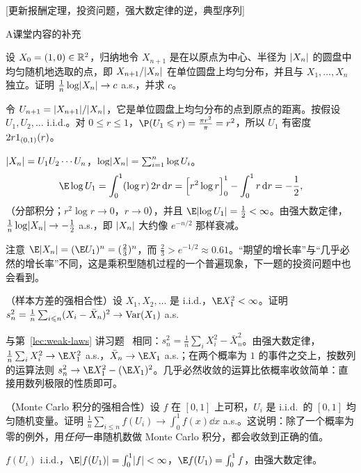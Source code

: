 [更新报酬定理，投资问题，强大数定律的逆，典型序列]
\label{hw:strong-laws}


\begin{exercises}{A}{课堂内容的补充}
\item\label{ex:strong-laws:A1} 设 $X_0=(1,0)\in\mathbb{R}^2$，归纳地令 $X_{n+1}$ 是在以原点为中心、半径为 $\lvert X_n\rvert$ 的圆盘中均匀随机地选取的点，即 $X_{n+1}/\lvert X_n\rvert$ 在单位圆盘上均匀分布，并且与 $X_1,\dots,X_n$ 独立。证明 $\frac1n\log\lvert X_n\rvert\to c$ a.s.，并求 $c$。
\begin{solution}
令 $U_{n+1}=\lvert X_{n+1}\rvert/\lvert X_n\rvert$，它是单位圆盘上均匀分布的点到原点的距离。按假设 $U_1,U_2,\dots$ i.i.d.。对 $0\leqslant r\leqslant1$，$\P(U_1\leqslant r)=\frac{\pi r^2}\pi=r^2$，所以 $U_1$ 有密度 $2r1_{(0,1)}(r)$。

$\lvert X_n\rvert=U_1U_2\cdots U_n$，$\log\lvert X_n\rvert=\sum_{i=1}^n\log U_i$。
\[
\E\log U_1=\int_0^1(\log r)\,2r\dd r=\Bigl[r^2\log r\Bigr]_0^1-\int_0^1r\dd r=-\frac12,
\]
（分部积分；$r^2\log r\to0$，$r\to0$），并且 $\E\abs{\log U_1}=\frac12<\infty$。由强大数定律，$\frac1n\log\lvert X_n\rvert\to-\frac12$ a.s.，即 $\lvert X_n\rvert$ 大约像 $e^{-n/2}$ 那样衰减。

注意 $\E\abs{X_n}=(\E U_1)^n=(\frac23)^n$，而 $\frac23>e^{-1/2}\approx0.61$。“期望的增长率”与“几乎必然的增长率”不同，这是乘积型随机过程的一个普遍现象，下一题的投资问题中也会看到。
\end{solution}

\item\label{ex:strong-laws:A2} （样本方差的强相合性）设 $X_1,X_2,\dots$ 是 i.i.d.，$\E X_1^2<\infty$。证明 $s_n^2=\frac1n\sum_{i\leqslant n}(X_i-\bar X_n)^2\to\operatorname{Var}(X_1)$ a.s.
\begin{solution}
与第~\ref{lec:weak-laws} 讲习题~ 相同：$s_n^2=\frac1n\sum_iX_i^2-\bar X_n^2$。由强大数定律，$\frac1n\sum_iX_i^2\to \E X_1^2$ a.s.，$\bar X_n\to \E X_1$ a.s.；在两个概率为 $1$ 的事件之交上，按数列的运算法则 $s_n^2\to \E X_1^2-(\E X_1)^2$。几乎必然收敛的运算比依概率收敛简单：直接用数列极限的性质即可。
\end{solution}

\item\label{ex:strong-laws:A3} （Monte Carlo 积分的强相合性）设 $f$ 在 $[0,1]$ 上可积，$U_i$ 是 i.i.d.\ 的 $[0,1]$ 均匀随机变量。证明 $\frac1n\sum_{i\leqslant n}f(U_i)\to\int_0^1f(x)\dd x$ a.s.。这说明：除了一个概率为零的例外，用\emph{任何}一串随机数做 Monte Carlo 积分，都会收敛到正确的值。
\begin{solution}
$f(U_i)$ i.i.d.，$\E\abs{f(U_1)}=\int_0^1\abs f<\infty$，$\E f(U_1)=\int_0^1f$，由强大数定律。
\end{solution}


\end{exercises}
